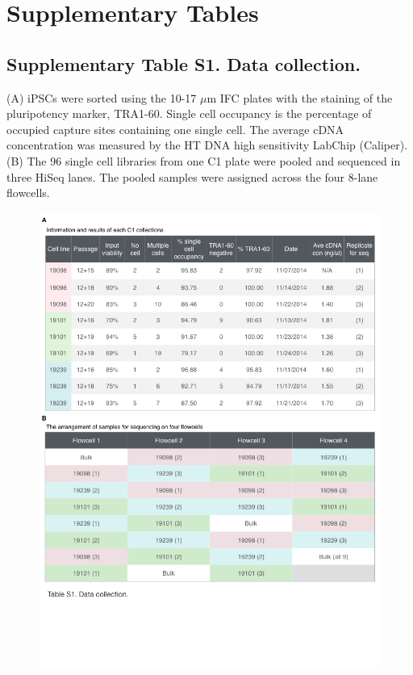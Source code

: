 \section{Supplementary Tables}\label{supplementary-tables}

\subsection{Supplementary Table S1. Data
collection.}\label{supplementary-table-s1.-data-collection.}

(A) iPSCs were sorted using the 10-17 $\mu$m IFC plates with the
staining of the pluripotency marker, TRA1-60. Single cell occupancy is
the percentage of occupied capture sites containing one single cell. The
average cDNA concentration was measured by the HT DNA high sensitivity
LabChip (Caliper). (B) The 96 single cell libraries from one C1 plate
were pooled and sequenced in three HiSeq lanes. The pooled samples were
assigned across the four 8-lane flowcells.

\begin{figure}[htbp]
\centering
\includegraphics[width=5in]{img/ch04/Figure16.jpeg}
\end{figure}

